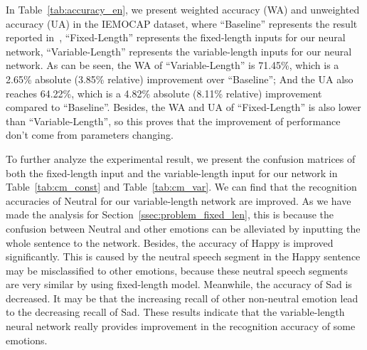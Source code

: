 \documentclass[a4paper]{article}
\begin{document}
In Table~\ref{tab:accuracy_en}, we present weighted accuracy (WA) and unweighted accuracy (UA) in the IEMOCAP dataset, where ``Baseline'' represents the result reported in~\cite{satt2017}, ``Fixed-Length'' represents the fixed-length inputs for our neural network, ``Variable-Length'' represents the variable-length inputs for our neural network. As can be seen, the WA of ``Variable-Length'' is 71.45\%, which is a 2.65\% absolute (3.85\% relative) improvement over ``Baseline''; And the UA also reaches 64.22\%, which is a 4.82\% absolute (8.11\% relative) improvement compared to ``Baseline''. Besides, the WA and UA of ``Fixed-Length'' is also lower than ``Variable-Length'', so this proves that the improvement of performance don't come from parameters changing.

To further analyze the experimental result, we present the confusion matrices of both the fixed-length input and the variable-length input for our network in Table~\ref{tab:cm_const} and Table~\ref{tab:cm_var}. We can find that the recognition accuracies of Neutral for our variable-length network are improved. As we have made the analysis for Section~\ref{ssec:problem_fixed_len}, this is because the confusion between Neutral and other emotions can be alleviated by inputting the whole sentence to the network. Besides, the accuracy of Happy is improved significantly. This is caused by the neutral speech segment in the Happy sentence may be misclassified to other emotions, because these neutral speech segments are very similar by using fixed-length model. Meanwhile, the accuracy of Sad is decreased. It may be that the increasing recall of other non-neutral emotion lead to the decreasing recall of Sad. These results indicate that the variable-length neural network really provides improvement in the recognition accuracy of some emotions.

\begin{table}[htb]
    \caption{Comparison of weighted accuracy (WA) and unweighted accuracy (UA) on IEMOCAP dataset}
    \label{tab:accuracy_en}
\end{table}
\end{document}
